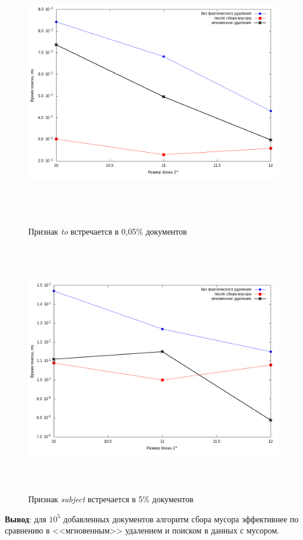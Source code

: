 \begin{figure}[H]
\includegraphics[width=\linewidth, height=11cm]{fig/limit_1e6/1e5/to.png}
\caption{Признак \textit{to} встречается в 0,05\% документов}
\includegraphics[width=\linewidth, height=11cm]{fig/limit_1e6/1e5/subject.png}
\caption{Признак \textit{subject} встречается в 5\% документов}
\end{figure}

\textbf{Вывод}: для $10^5$ добавленных документов алгоритм сбора мусора эффективнее
по сравнению в <<мгновенным>> удалением и поиском в данных с мусором.

